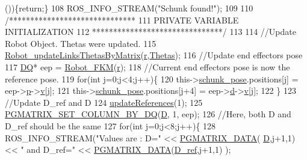 \begin{DoxyCode}
      ())\{\textcolor{keywordflow}{return};\}
108         ROS\_INFO\_STREAM(\textcolor{stringliteral}{"Schunk found!"});
109 
110         \textcolor{comment}{/******************************}
111 \textcolor{comment}{        PRIVATE VARIABLE INITIALIZATION}
112 \textcolor{comment}{        *******************************/}
113 
114         \textcolor{comment}{//Update Robot Object. Thetas were updated.}
115         \hyperlink{robot_8h_aa1d3aca5132bd5f347f5966d38fbb966}{Robot\_updateLinksThetasByMatrix}(\hyperlink{classCartesian__controller_a5562129951bd802e4ded77fc716c87a0}{r},\hyperlink{classCartesian__controller_a0a0f818dad601cd9e3e26cb6959b8eb6}{Thetas});
116         \textcolor{comment}{//Update end effectors pose}
117         \hyperlink{structDQ}{DQ}* eep = \hyperlink{robot_8h_a57cc252fbb9e4c8be955b6af755b0c2c}{Robot\_FKM}(\hyperlink{classCartesian__controller_a5562129951bd802e4ded77fc716c87a0}{r});
118         \textcolor{comment}{//Current end effectors pose is now the reference pose.}
119         \textcolor{keywordflow}{for}(\textcolor{keywordtype}{int} j=0;j<4;j++)\{
120                 this->\hyperlink{classCartesian__pose__controller_a301bc44e901e4837cf036661478354c4}{schunk\_pose}.positions[j]   = eep->\hyperlink{structDQ_a878210bff170f4392d6cbe2d4704ffdc}{p}->\hyperlink{structQ_a2a0074b583999340d42804e4c1141ac4}{v}[j];
121                 this->\hyperlink{classCartesian__pose__controller_a301bc44e901e4837cf036661478354c4}{schunk\_pose}.positions[j+4] = eep->\hyperlink{structDQ_a535cdb52876521fd6abbfcf211a7c702}{d}->\hyperlink{structQ_a2a0074b583999340d42804e4c1141ac4}{v}[j];
122         \}
123         \textcolor{comment}{//Update D\_ref and D}
124         \hyperlink{classCartesian__pose__controller_a965f86a383eb205df10832626fac98af}{updateReferences}(1);
125         \hyperlink{dualquaternion_8h_a3d48348c3e25d1724058c2cf2364e42e}{PGMATRIX\_SET\_COLUMN\_BY\_DQ}(\hyperlink{classCartesian__controller_a8c470b652ce436d8e48f126073fc2593}{D}, 1, eep);
126         \textcolor{comment}{//Here, both D and D\_ref should be the same}
127         \textcolor{keywordflow}{for}(\textcolor{keywordtype}{int} j=0;j<8;j++)\{
128                 ROS\_INFO\_STREAM(\textcolor{stringliteral}{"Values are : D="} << \hyperlink{gmatrix_8h_a7333180c47234295df2bd7b09ac00da8}{PGMATRIX\_DATA}(
      \hyperlink{classCartesian__controller_a8c470b652ce436d8e48f126073fc2593}{D},j+1,1) << \textcolor{stringliteral}{" and D\_ref="} << \hyperlink{gmatrix_8h_a7333180c47234295df2bd7b09ac00da8}{PGMATRIX\_DATA}(\hyperlink{classCartesian__controller_abb248cb3215a574fe8e1bb8fb0b8626d}{D\_ref},j+1,1) );

\end{DoxyCode}
